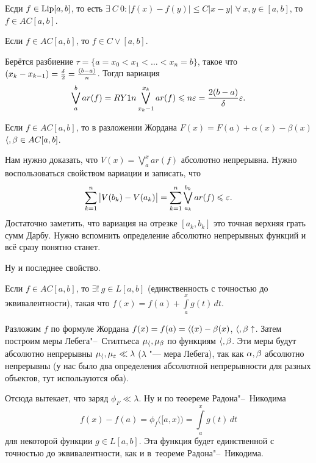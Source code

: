 \begin{Ut}
  Есди $f\in \operatorname{Lip}[a,b]$, то есть $\exists\ C\>0\colon \big|f(x)-f(y)\big|\le C|x-y|$ $\forall\ x,y\in[a,b]$, то $f\in AC[a,b]$.
\end{Ut}

\begin{Ut}
  Если $f\in AC[a,b]$, то $f\in C\vee [a,b]$.
\end{Ut}

\begin{Proof}
  Берётся разбиение $\tau = \{a=x_0<x_1<\dots<x_n=b\}$, такое что $(x_k-x_{k-1})=\frac{\delta}2 = \frac{(b-a)}n$. Тогдп вариация
  \[
\bigvee\limits_a^bar(f) = RY 1n\bigvee\limits_{x_k-1}^{x_k}ar(f)\leqslant n\varepsilon = \frac{2(b-a)}{\delta}\varepsilon.
\] 
\end{Proof}
\begin{Ut}
  Если $f\in AC[a,b]$, то в разложении Жордана $F(x) =F(a)+\alpha(x)-\beta(x)$ $\langle,\beta\in AC[a,b]$.
\end{Ut}
\begin{Proof}
 Нам нужно доказать, что $V(x) = \bigvee\limits_a^xar(f)$ абсолютно непрерывна. Нужно воспользоваться свойством вариации и записать, что
\[
  \sum\limits_{k = 1}^{n}  \big|V(b_k)-V(a_k)\big| = \sum\limits_{k = 1}^{n} \bigvee\limits_{a_k}^{b_k}ar(f)\leqslant\varepsilon.
\]
Достаточно заметить, что вариация на отрезке $[a_k,b_k]$ это точная верхняя грать сумм Дарбу. Нужно вспомнить определение абсолютно непрерывных функций и всё сразу понятно станет.
\end{Proof}

Ну и последнее свойство.
\begin{Ut}
  Если $f\in AC[a,b]$, то $\exists!\ g\in L[a,b]$ (единственность с точностью до эквивалентности), такая что $f(x) = f(a)+\int\limits_a^x g(t)\,dt$.
\end{Ut}
\begin{Proof}
  Разложим $f$ по формуле Жордана $f(x) = f(a) = \langle(x)-\beta(x)$, $\langle,\beta\uparrow$. Затем построим меры Лебега"--~Стилтьеса $\mu_\langle,\mu_\beta$ по функциям $\langle,\beta$. Эти меры будут абсолютно непрерывны $\mu_\langle,\mu_\varepsilon\ll\lambda$ ($\lambda$ "--- мера Лебега), так как $\alpha,\beta$ абсолютно непрерывны (у нас было два определения абсолютной непрерывности для разных объектов, тут используются оба).

Отсюда вытекает, что заряд $\phi_F\ll \lambda$. Ну и по теоереме Радона"--~Никодима 
\[
  f(x)-f(a) = \phi_f\big([a,x)\big)=\int\limits_a^xg(t)\,dt
\]
для некоторой функции $g\in L[a,b]$. Эта функция будет единственной с точностью до эквивалентности, как и в~теореме Радона"--~Никодима.
\end{Proof}

